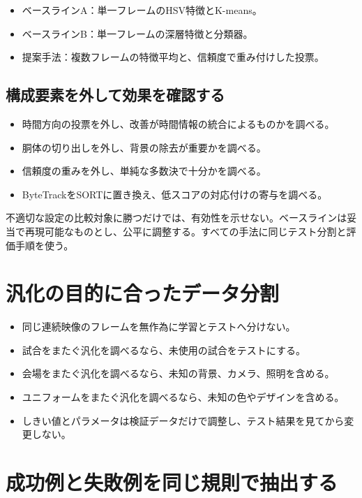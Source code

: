 \documentclass[11pt,a4paper,oneside]{report}
\begin{document}
\begin{itemize}
  \item ベースラインA：単一フレームのHSV特徴とK-means。
  \item ベースラインB：単一フレームの深層特徴と分類器。
  \item 提案手法：複数フレームの特徴平均と、信頼度で重み付けした投票。
\end{itemize}

\subsection{構成要素を外して効果を確認する}

\begin{itemize}
  \item 時間方向の投票を外し、改善が時間情報の統合によるものかを調べる。
  \item 胴体の切り出しを外し、背景の除去が重要かを調べる。
  \item 信頼度の重みを外し、単純な多数決で十分かを調べる。
  \item ByteTrackをSORTに置き換え、低スコアの対応付けの寄与を調べる。
\end{itemize}

\begin{riskBox}
不適切な設定の比較対象に勝つだけでは、有効性を示せない。ベースラインは妥当で再現可能なものとし、公平に調整する。すべての手法に同じテスト分割と評価手順を使う。
\end{riskBox}

\section{汎化の目的に合ったデータ分割}

\begin{itemize}
  \item 同じ連続映像のフレームを無作為に学習とテストへ分けない。
  \item 試合をまたぐ汎化を調べるなら、未使用の試合をテストにする。
  \item 会場をまたぐ汎化を調べるなら、未知の背景、カメラ、照明を含める。
  \item ユニフォームをまたぐ汎化を調べるなら、未知の色やデザインを含める。
  \item しきい値とパラメータは検証データだけで調整し、テスト結果を見てから変更しない。
\end{itemize}

\section{成功例と失敗例を同じ規則で抽出する}
\end{document}
